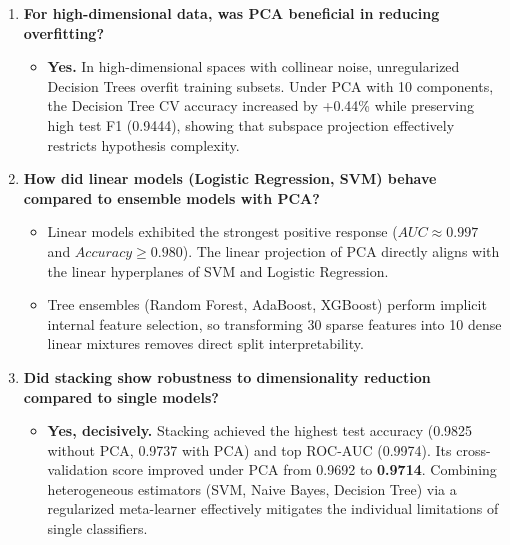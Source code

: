 \documentclass[12pt,a4paper]{article}
\begin{document}
\begin{enumerate}[leftmargin=*]
    \item \textbf{For high-dimensional data, was PCA beneficial in reducing overfitting?}
    \begin{itemize}
        \item \textbf{Yes.} In high-dimensional spaces with collinear noise, unregularized Decision Trees overfit training subsets. Under PCA with 10 components, the Decision Tree CV accuracy increased by +0.44\% while preserving high test F1 (0.9444), showing that subspace projection effectively restricts hypothesis complexity.
    \end{itemize}

    \item \textbf{How did linear models (Logistic Regression, SVM) behave compared to ensemble models with PCA?}
    \begin{itemize}
        \item Linear models exhibited the strongest positive response ($AUC \approx 0.997$ and $Accuracy \ge 0.980$). The linear projection of PCA directly aligns with the linear hyperplanes of SVM and Logistic Regression.
        \item Tree ensembles (Random Forest, AdaBoost, XGBoost) perform implicit internal feature selection, so transforming 30 sparse features into 10 dense linear mixtures removes direct split interpretability.
    \end{itemize}

    \item \textbf{Did stacking show robustness to dimensionality reduction compared to single models?}
    \begin{itemize}
        \item \textbf{Yes, decisively.} Stacking achieved the highest test accuracy (0.9825 without PCA, 0.9737 with PCA) and top ROC-AUC (0.9974). Its cross-validation score improved under PCA from 0.9692 to \textbf{0.9714}. Combining heterogeneous estimators (SVM, Naive Bayes, Decision Tree) via a regularized meta-learner effectively mitigates the individual limitations of single classifiers.
    \end{itemize}
\end{enumerate}
\end{document}
